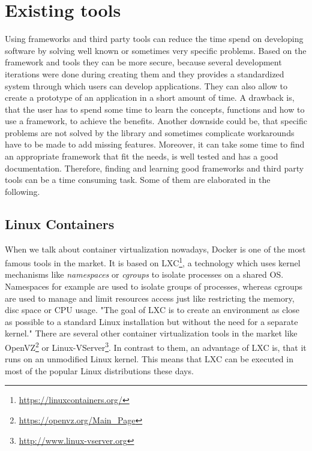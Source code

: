 \section{Existing tools}

Using frameworks and third party tools can reduce the time spend on developing software by solving well known or sometimes very specific problems.
Based on the framework and tools they can be more secure, because several development iterations were done during creating them and they provides a standardized system through which users can develop applications.
They can also allow to create a prototype of an application in a short amount of time.
A drawback is, that the user has to spend some time to learn the concepts, functions and how to use a framework, to achieve the benefits.
Another downside could be, that specific problems are not solved by the library and sometimes complicate workarounds have to be made to add missing features.
Moreover, it can take some time to find an appropriate framework that fit the needs, is well tested and has a good documentation.
Therefore, finding and learning good frameworks and third party tools can be a time consuming task.
Some of them are elaborated in the following.

\subsection{Linux Containers}
When we talk about container virtualization nowadays, Docker is one of the most famous tools in the market.
It is based on \ac{LXC}\footnote{\url{https://linuxcontainers.org/}}, a technology which uses kernel mechanisms like \textit{namespaces} or \textit{cgroups} to isolate processes on a shared \ac{OS}.\autocite[cf.][p. 381]{Pahl:2015}
Namespaces for example are used to isolate groups of processes, whereas cgroups are used to manage and limit resources access just like restricting the memory, disc space or \ac{CPU} usage.\autocite[cf.][p. 381]{Pahl:2015}
"The goal of \ac{LXC} is to create an environment as close as possible to a standard Linux installation but without the need for a separate kernel."\autocite[p. 72]{Tosatto:2015}
There are several other container virtualization tools in the market like OpenVZ\footnote{\url{https://openvz.org/Main_Page}} or Linux-VServer\footnote{\url{http://www.linux-vserver.org}}.
In contrast to them, an advantage of \ac{LXC} is, that it runs on an unmodified Linux kernel.
This means that \ac{LXC} can be executed in most of the popular Linux distributions these days.

